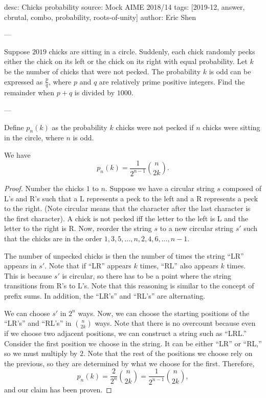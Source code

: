 desc: Chicks probability
source: Mock AIME 2018/14
tags: [2019-12, answer, cbrutal, combo, probability, roots-of-unity]
author: Eric Shen

---

Suppose $2019$ chicks are sitting in a circle. Suddenly, each chick randomly pecks either the chick on its left or the chick on its right with equal probability. Let $k$ be the number of chicks that were not pecked. The probability $k$ is odd can be expressed as $\frac{p}{q}$, where $p$ and $q$ are relatively prime positive integers. Find the remainder when $p+q$ is divided by $1000$.

---

Define $p_n(k)$ as the probability $k$ chicks were not pecked if $n$ chicks were sitting in the circle, where $n$ is odd.
\begin{claim*}
    We have \[p_n(k)=\frac{1}{2^{n-1}}\binom{n}{2k}.\]
\end{claim*}
\begin{proof}
    Number the chicks $1$ to $n$. Suppose we have a circular string $s$ composed of L's and R's such that a L represents a peck to the left and a R represents a peck to the right. (Note circular means that the character after the last character is the first character). A chick is not pecked iff the letter to the left is L and the letter to the right is R. Now, reorder the string $s$ to a new circular string $s'$ such that the chicks are in the order $1,3,5,\ldots,n,2,4,6,\ldots,n-1$. 

    The number of unpecked chicks is then the number of times the string ``LR'' appears in $s'$. Note that if ``LR'' appears $k$ times, ``RL'' also appears $k$ times. This is because $s'$ is circular, so there has to be a point where the string transitions from R's to L's. Note that this reasoning is similar to the concept of prefix sums. In addition, the ``LR's'' and ``RL's'' are alternating.

    We can choose $s'$ in $2^n$ ways. Now, we can choose the starting positions of the ``LR's'' and ``RL's'' in $\binom{n}{2k}$ ways. Note that there is no overcount because even if we choose two adjacent positions, we can construct a string such as ``LRL.'' Consider the first position we choose in the string. It can be either ``LR'' or ``RL,'' so we must multiply by $2$. Note that the rest of the positions we choose rely on the previous, so they are determined by what we choose for the first. Therefore, \[p_n(k)=\frac{2}{2^n}\binom{n}{2k}=\frac{1}{2^{n-1}}\binom{n}{2k},\]
    and our claim has been proven.
\end{proof}


